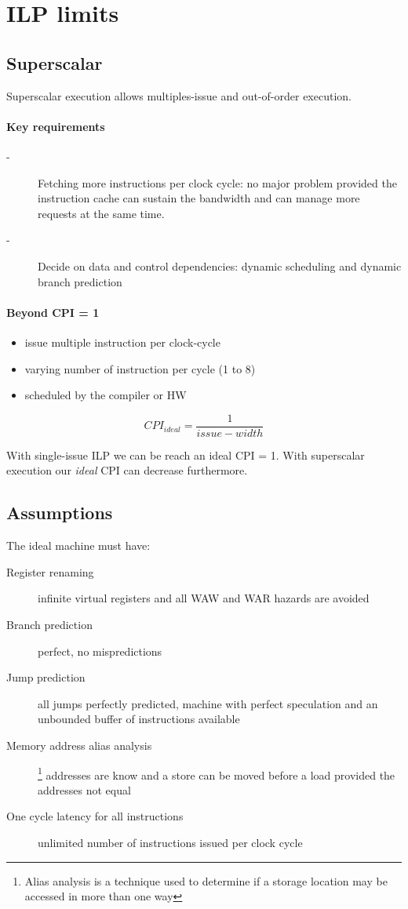 \section{ILP limits}\label{sec:ilp-limits}
\subsection{Superscalar}\label{subsec:superscalar}
Superscalar execution allows multiples-issue and out-of-order execution.

\paragraph{Key requirements}
\begin{description}
    \item[-] Fetching more instructions per clock cycle: no major problem provided the instruction cache can sustain
    the bandwidth and can manage more requests at the same time.
    \item[-] Decide on data and control dependencies: dynamic scheduling and dynamic branch prediction
\end{description}

\paragraph{Beyond CPI = 1} 
\begin{itemize}[noitemsep]
    \item issue multiple instruction per clock-cycle
    \item varying number of instruction per cycle (1 to 8)
    \item scheduled by the compiler or HW
\end{itemize}
\[CPI_{ideal} =\frac{1}{issue-width}\]


With single-issue ILP we can be reach an ideal CPI = 1.
With superscalar execution our \textit{ideal} CPI can decrease furthermore.

\subsection{Assumptions}\label{subsec:assumptions}
The ideal machine must have:
\begin{description}
    \item[Register renaming] infinite virtual registers and all WAW and WAR hazards are avoided
    \item[Branch prediction] perfect, no mispredictions
    \item[Jump prediction] all jumps perfectly predicted, machine with perfect speculation and an unbounded buffer of
    instructions available
    \item[Memory address alias analysis]\footnote{Alias analysis is a technique used to determine if a storage location may be accessed in more than one way} addresses are know and a store can be moved before a load provided the 
    addresses not equal 
    \item[One cycle latency for all instructions] unlimited number of instructions issued per clock cycle
\end{description}

